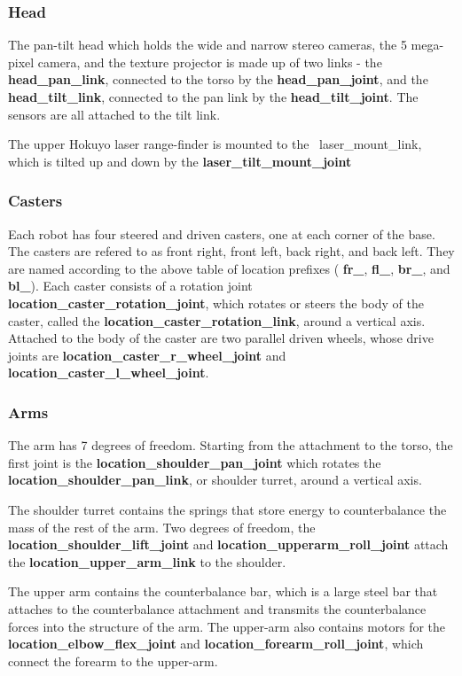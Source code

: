 \subsubsection{Head}
The pan-tilt head which holds the wide and narrow stereo cameras, the 5
mega-pixel camera, and the texture projector is made up of two links - the {\bf
  head\_pan\_link}, connected to the torso by the {\bf head\_pan\_joint}, and
the {\bf head\_tilt\_link}, connected to the pan link by the {\bf
  head\_tilt\_joint}.  The sensors are all attached to the tilt link.

The upper Hokuyo laser range-finder is mounted to the {\ laser\_mount\_link},
which is tilted up and down by the {\bf laser\_tilt\_mount\_joint}
\subsubsection{Casters}
Each robot has four steered and driven casters, one at each corner of the base.
The casters are refered to as front right, front left, back right, and back
left.  They are named according to the above table of location prefixes ({\bf
  fr\_}, {\bf fl\_}, {\bf br\_}, and {\bf bl\_}).  Each caster consists of a
rotation joint {\bf location\_caster\_rotation\_joint}, which rotates or steers
the body of the caster, called the {\bf location\_caster\_rotation\_link},
around a vertical axis.  Attached to the body of the caster are two parallel
driven wheels, whose drive joints are {\bf location\_caster\_r\_wheel\_joint}
and {\bf location\_caster\_l\_wheel\_joint}.

\subsubsection{Arms}
The arm has 7 degrees of freedom.  Starting from the attachment to the torso,
the first joint is the {\bf location\_shoulder\_pan\_joint} which rotates the
{\bf location\_shoulder\_pan\_link}, or shoulder turret, around a vertical axis.

The shoulder turret contains the springs that store energy to counterbalance the
mass of the rest of the arm.  Two degrees of freedom, the {\bf
  location\_shoulder\_lift\_joint} and {\bf location\_upperarm\_roll\_joint}
attach the {\bf location\_upper\_arm\_link} to the shoulder.

The upper arm contains the counterbalance bar, which is a large steel bar that
attaches to the counterbalance attachment and transmits the counterbalance
forces into the structure of the arm.  The upper-arm also contains motors for
the {\bf location\_elbow\_flex\_joint} and {\bf location\_forearm\_roll\_joint},
which connect the forearm to the upper-arm.

